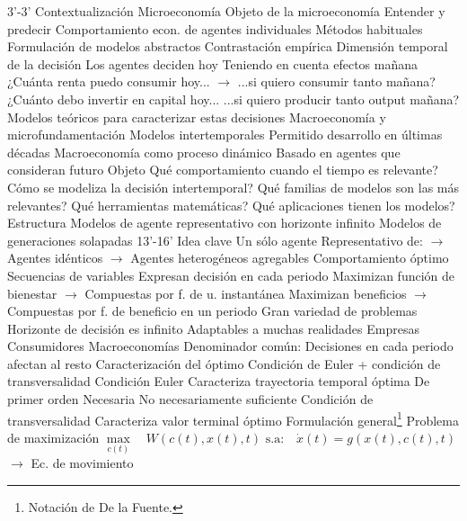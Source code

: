 \documentclass{nuevotema}
\begin{document}
\esquemalargo

\begin{esquemal}
	\1[]  3'-3'
		\2 Contextualización
			\3 Microeconomía
				\4 Objeto de la microeconomía
				\4[] Entender y predecir
				\4[] Comportamiento econ. de agentes individuales
				\4 Métodos habituales
				\4[] Formulación de modelos abstractos
				\4[] Contrastación empírica
			\3 Dimensión temporal de la decisión
				\4 Los agentes deciden hoy
				\4[] Teniendo en cuenta efectos mañana
				\4 ¿Cuánta renta puedo consumir hoy...
				\4[] $\to$ ...si quiero consumir tanto mañana?
				\4 ¿Cuánto debo invertir en capital hoy...
				\4[] ...si quiero producir tanto output mañana?
				\4 Modelos teóricos para caracterizar estas decisiones
			\3 Macroeconomía y microfundamentación
				\4 Modelos intertemporales
				\4[] Permitido desarrollo en últimas décadas
				\4 Macroeconomía como proceso dinámico
				\4[] Basado en agentes que consideran futuro
		\2 Objeto
			\3 Qué comportamiento cuando el tiempo es relevante?
			\3 Cómo se modeliza la decisión intertemporal?
			\3 Qué familias de modelos son las más relevantes?
			\3 Qué herramientas matemáticas?
			\3 Qué aplicaciones tienen los modelos?
		\2 Estructura
			\3 Modelos de agente representativo con horizonte infinito
			\3 Modelos de generaciones solapadas
	\1  13'-16'
		\2 Idea clave
			\3 Un sólo agente
				\4 Representativo de:
				\4[] $\to$ Agentes idénticos
				\4[] $\to$ Agentes heterogéneos agregables
			\3 Comportamiento óptimo
				\4 Secuencias de variables
				\4[] Expresan decisión en cada periodo
				\4 Maximizan función de bienestar
				\4[] $\to$ Compuestas por f. de u. instantánea
				\4 Maximizan beneficios
				\4[] $\to$ Compuestas por f. de beneficio en un periodo
			\3 Gran variedad de problemas
				\4 Horizonte de decisión es infinito
				\4 Adaptables a muchas realidades
				\4[] Empresas
				\4[] Consumidores
				\4[] Macroeconomías
				\4 Denominador común:
				\4[] Decisiones en cada periodo afectan al resto
			\3 Caracterización del óptimo
				\4 Condición de Euler + condición de transversalidad
				\4 Condición Euler
				\4[] Caracteriza trayectoria temporal óptima
				\4[] De primer orden
				\4[] Necesaria
				\4[] No necesariamente suficiente
				\4 Condición de transversalidad
				\4[] Caracteriza valor terminal óptimo
		\2 Formulación general\footnote{Notación de De la Fuente.}
			\3 Problema de maximización
				\4[] $\underset{ c(t) }{\max} \quad W (c(t), x(t), t)$
				\4[] $\text{s.a:} \quad \dot{x}(t) = g(x(t), c(t), t)$ $\to$ Ec. de movimiento

\end{esquemal}
\end{document}
